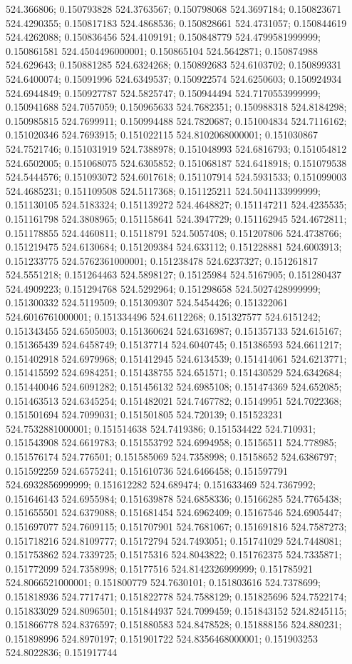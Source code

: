 524.366806; 0.150793828 524.3763567; 0.150798068 524.3697184; 0.150823671 524.4290355; 0.150817183 524.4868536; 0.150828661 524.4731057; 0.150844619 524.4262088; 0.150836456 524.4109191; 0.150848779 524.4799581999999; 0.150861581 524.4504496000001; 0.150865104 524.5642871; 0.150874988 524.629643; 0.150881285 524.6324268; 0.150892683 524.6103702; 0.150899331 524.6400074; 0.15091996 524.6349537; 0.150922574 524.6250603; 0.150924934 524.6944849; 0.150927787 524.5825747; 0.150944494 524.7170553999999; 0.150941688 524.7057059; 0.150965633 524.7682351; 0.150988318 524.8184298; 0.150985815 524.7699911; 0.150994488 524.7820687; 0.151004834 524.7116162; 0.151020346 524.7693915; 0.151022115 524.8102068000001; 0.151030867 524.7521746; 0.151031919 524.7388978; 0.151048993 524.6816793; 0.151054812 524.6502005; 0.151068075 524.6305852; 0.151068187 524.6418918; 0.151079538 524.5444576; 0.151093072 524.6017618; 0.151107914 524.5931533; 0.151099003 524.4685231; 0.151109508 524.5117368; 0.151125211 524.5041133999999; 0.151130105 524.5183324; 0.151139272 524.4648827; 0.151147211 524.4235535; 0.151161798 524.3808965; 0.151158641 524.3947729; 0.151162945 524.4672811; 0.151178855 524.4460811; 0.15118791 524.5057408; 0.151207806 524.4738766; 0.151219475 524.6130684; 0.151209384 524.633112; 0.151228881 524.6003913; 0.151233775 524.5762361000001; 0.151238478 524.6237327; 0.151261817 524.5551218; 0.151264463 524.5898127; 0.15125984 524.5167905; 0.151280437 524.4909223; 0.151294768 524.5292964; 0.151298658 524.5027428999999; 0.151300332 524.5119509; 0.151309307 524.5454426; 0.151322061 524.6016761000001; 0.151334496 524.6112268; 0.151327577 524.6151242; 0.151343455 524.6505003; 0.151360624 524.6316987; 0.151357133 524.615167; 0.151365439 524.6458749; 0.15137714 524.6040745; 0.151386593 524.6611217; 0.151402918 524.6979968; 0.151412945 524.6134539; 0.151414061 524.6213771; 0.151415592 524.6984251; 0.151438755 524.651571; 0.151430529 524.6342684; 0.151440046 524.6091282; 0.151456132 524.6985108; 0.151474369 524.652085; 0.151463513 524.6345254; 0.151482021 524.7467782; 0.15149951 524.7022368; 0.151501694 524.7099031; 0.151501805 524.720139; 0.151523231 524.7532881000001; 0.151514638 524.7419386; 0.151534422 524.710931; 0.151543908 524.6619783; 0.151553792 524.6994958; 0.15156511 524.778985; 0.151576174 524.776501; 0.151585069 524.7358998; 0.15158652 524.6386797; 0.151592259 524.6575241; 0.151610736 524.6466458; 0.151597791 524.6932856999999; 0.151612282 524.689474; 0.151633469 524.7367992; 0.151646143 524.6955984; 0.151639878 524.6858336; 0.15166285 524.7765438; 0.151655501 524.6379088; 0.151681454 524.6962409; 0.15167546 524.6905447; 0.151697077 524.7609115; 0.151707901 524.7681067; 0.151691816 524.7587273; 0.151718216 524.8109777; 0.15172794 524.7493051; 0.151741029 524.7448081; 0.151753862 524.7339725; 0.15175316 524.8043822; 0.151762375 524.7335871; 0.151772099 524.7358998; 0.15177516 524.8142326999999; 0.151785921 524.8066521000001; 0.151800779 524.7630101; 0.151803616 524.7378699; 0.151818936 524.7717471; 0.151822778 524.7588129; 0.151825696 524.7522174; 0.151833029 524.8096501; 0.151844937 524.7099459; 0.151843152 524.8245115; 0.151866778 524.8376597; 0.151880583 524.8478528; 0.151888156 524.880231; 0.151898996 524.8970197; 0.151901722 524.8356468000001; 0.151903253 524.8022836; 0.151917744 